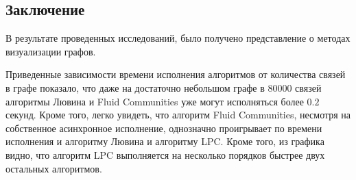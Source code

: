 \subsection*{Заключение}

В результате проведенных исследований, было получено представление о методах визуализации графов.

Приведенные зависимости времени исполнения алгоритмов от количества связей в графе показало, что даже на достаточно небольшом графе в 80000 связей алгоритмы Лювина и Fluid Communities уже могут исполняться более $0.2$ секунд. Кроме того, легко увидеть, что алгоритм Fluid Communities, несмотря на собственное асинхронное исполнение, однозначно проигрывает по времени исполнения и алгоритму Лювина и алгоритму LPC. Кроме того, из графика видно, что алгоритм LPC выполняется на несколько порядков быстрее двух остальных алгоритмов.